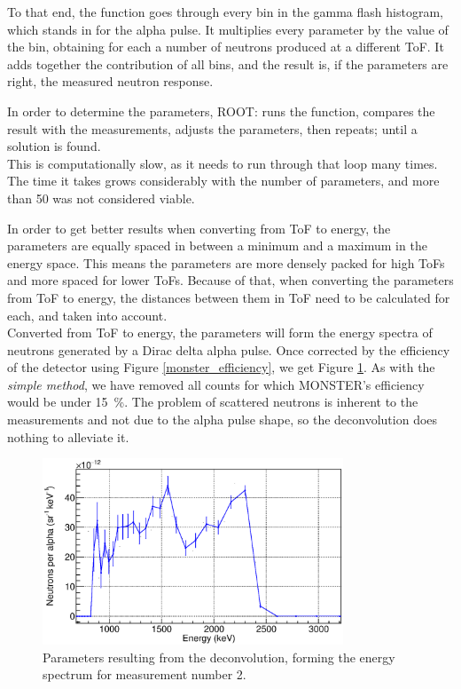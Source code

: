 \documentclass[a4paper,12pt]{report}
\begin{document}
To that end, the function goes through every bin in the gamma flash histogram, which stands in for the alpha pulse.
It multiplies every parameter by the value of the bin, obtaining for each a number of neutrons produced at a different ToF.
It adds together the contribution of all bins, and the result is, if the parameters are right, the measured neutron response.

In order to determine the parameters, ROOT: runs the function, compares the result with the measurements, adjusts the parameters, then repeats; until a solution is found.
\\

This is computationally slow, as it needs to run through that loop many times.
The time it takes grows considerably with the number of parameters, and more than 50 was not considered viable.

In order to get better results when converting from ToF to energy, the parameters are equally spaced in between a minimum and a maximum in the energy space.
This means the parameters are more densely packed for high ToFs and more spaced for lower ToFs.
Because of that, when converting the parameters from ToF to energy, the distances between them in ToF need to be calculated for each, and taken into account.
\\

Converted from ToF to energy, the parameters will form the energy spectra of neutrons generated by a Dirac delta alpha pulse.
Once corrected by the efficiency of the detector using Figure \ref{monster_efficiency}, we get Figure \ref{pulsed_deconvolution}.
As with the \textit{simple method}, we have removed all counts for which MONSTER's efficiency would be under \qty{15}{\percent}.
The problem of scattered neutrons is inherent to the measurements and not due to the alpha pulse shape, so the deconvolution does nothing to alleviate it.

\begin{figure}[H]
	\centering
	\includegraphics[width=0.80\textwidth]{pulsed_deconvolution.eps}
	\caption{Parameters resulting from the deconvolution, forming the energy spectrum for measurement number 2.}
	\label{pulsed_deconvolution}
\end{figure}
\end{document}
